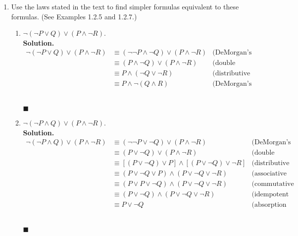 \documentclass{report}
\newcommand{\sol}{\vspace{1em}\\\textbf{Solution.}\vspace{0.5em}}
\newcommand{\qed}{\ \\\strut\hfill$\blacksquare$\vspace{1em}}
\begin{document}
\begin{enumerate}[leftmargin=*]
    \item Use the laws stated in the text to find simpler formulas equivalent to these
          formulas. (See Examples 1.2.5 and 1.2.7.)
          \begin{enumerate}
              \item $\neg(\neg P \vee Q) \vee(P \wedge \neg R)$.
                    \sol{}
                    \begin{align*}
                        \neg(\neg P \vee Q) \vee(P \wedge \neg R) & \equiv (\neg\neg P \wedge \neg Q) \vee(P \wedge \neg R) & \text{(DeMorgan's law)}      \\
                                                                  & \equiv (P \wedge \neg Q) \vee(P \wedge \neg R)          & \text{(double negation law)} \\
                                                                  & \equiv P \wedge (\neg Q \vee \neg R)                    & \text{(distributive law)}    \\
                                                                  & \equiv P \wedge \neg(Q \wedge R)                        & \text{(DeMorgan's law)}
                    \end{align*} \qed

              \item $\neg(\neg P \wedge Q) \vee(P \wedge \neg R)$.
                    \sol{}
                    \begin{align*}
                        \neg(\neg P \wedge Q) \vee(P \wedge \neg R) & \equiv (\neg\neg P \vee \neg Q) \vee(P \wedge \neg R)                & \text{(DeMorgan's law)}      \\
                                                                    & \equiv (P \vee \neg Q) \vee(P \wedge \neg R)                         & \text{(double negation law)} \\
                                                                    & \equiv [(P \vee \neg Q) \vee P] \wedge [(P \vee \neg Q) \vee \neg R] & \text{(distributive law)}    \\
                                                                    & \equiv (P \vee \neg Q \vee P) \wedge (P \vee \neg Q \vee \neg R)     & \text{(associative law)}     \\
                                                                    & \equiv (P \vee P \vee \neg Q) \wedge (P \vee \neg Q \vee \neg R)     & \text{(commutative law)}     \\
                                                                    & \equiv (P \vee \neg Q) \wedge (P \vee \neg Q \vee \neg R)            & \text{(idempotent law)}      \\
                                                                    & \equiv P \vee \neg Q                                                 & \text{(absorption law)}
                    \end{align*} \qed


\end{enumerate}
\end{enumerate}
\end{document}
